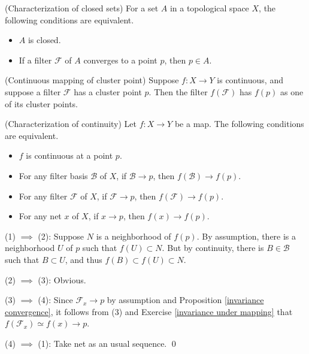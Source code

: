 \documentclass{report}
\begin{document}
\begin{exe}\label{characterize closed} (Characterization of closed sets)
    For a set \( A \) in a topological space \( X \), the following conditions are equivalent.
    \begin{itemize}
        \item[(1)] \( A \) is closed.
        \item[(2)] If a filter \( \mathscr{F} \) of \( A \) converges to a point \( p \), then \( p \in A \).
    \end{itemize}
\end{exe}

\begin{exe}\label{continous mapping of cp} (Continuous mapping of cluster point)
    Suppose \( f:X \to Y \) is continuous, and suppose a filter \( \mathscr{F} \) has a cluster point \( p \). Then the filter \( f(\mathscr{F}) \) has \( f(p) \) as one of its cluster points.
\end{exe}

\begin{prp}\label{characterize continuity} (Characterization of continuity)
    Let \( f:X \to Y \) be a map. The following conditions are equivalent.
    \begin{itemize}
        \item[(1)] \( f \) is continuous at a point \( p \).
        \item[(2)] For any filter basis \( \mathscr{B} \) of \( X \), if \( \mathscr{B} \to p \), then \( f(\mathscr{B}) \to f(p) \).
        \item[(3)] For any filter \( \mathscr{F} \) of \( X \), if \( \mathscr{F} \to p \), then \( f(\mathscr{F})\to f(p) \).
        \item[(4)] For any net \( x \) of \( X \), if \( x \to p \), then \( f(x)\to f(p) \).
    \end{itemize}
\end{prp}

\begin{prf}
    (1) \( \implies  \) (2):
    Suppose \( N \) is a neighborhood of \( f(p) \). By assumption, there is a neighborhood \( U \) of \( p \) such that \( f(U) \subset N \). But by continuity, there is \( B \in \mathscr{B} \) such that \( B \subset U \), and thus \( f(B) \subset f(U) \subset N \).

    (2) \( \implies \) (3): Obvious.

    (3) \( \implies \) (4):
    Since \( \mathscr{F}_x \to p \) by assumption and Proposition \ref{invariance convergence}, it follows from (3) and Exercise \ref{invariance under mapping} that \( f(\mathscr{F}_x) \simeq f(x)\to p \).

    (4) \( \implies \) (1): Take net as an usual sequence.
    \qed\end{prf}
\end{document}
